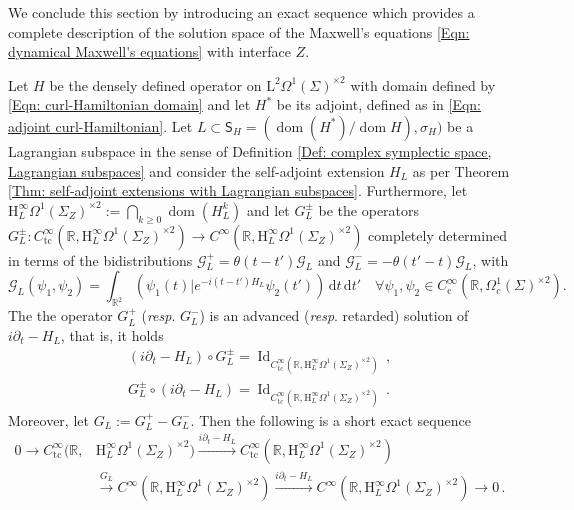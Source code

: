 We conclude this section by introducing an exact sequence which provides a complete description of the solution space of the Maxwell's equations \eqref{Eqn: dynamical Maxwell's equations} with interface $Z$.

\begin{theorem}\label{Thm: exact sequence for Maxwell's equations with interface}
	Let $H$ be the densely defined operator on $\mathrm{L}^2\Omega^1(\Sigma)^{\times2}$ with domain defined by \eqref{Eqn: curl-Hamiltonian domain} and let $H^*$ be its adjoint, defined as in \eqref{Eqn: adjoint curl-Hamiltonian}.
	Let $L\subset \mathsf{S}_H=(\operatorname{dom}(H^*)/\operatorname{dom}H),\sigma_H)$ be a Lagrangian subspace in the sense of Definition \ref{Def: complex symplectic space, Lagrangian subspaces} and consider the self-adjoint extension $H_L$ as per Theorem \ref{Thm: self-adjoint extensions with Lagrangian subspaces}. Furthermore, let $\mathrm{H}^\infty_L\Omega^1(\Sigma_Z)^{\times 2}:=\bigcap_{k\geq 0}\operatorname{dom}(H_L^k)$ and let $G^\pm_L$ be the operators $G^\pm_L\colon C^\infty_{\mathrm{tc}}(\mathbb{R},\mathrm{H}^\infty_L\Omega^1(\Sigma_Z)^{\times 2})\to C^\infty(\mathbb{R},\mathrm{H}^\infty_L\Omega^1(\Sigma_Z)^{\times 2})$ completely determined in terms of the bidistributions $\mathcal{G}_L^+=\theta(t-t')\mathcal{G}_L$ and $\mathcal{G}_L^-=-\theta(t'-t)\mathcal{G}_L$, with
	\begin{equation}\label{Eqn: Fundamental H}
	\mathcal{G}_L(\psi_1,\psi_2)=\int_{\mathbb{R}^2}\left(\psi_1(t)\Big|e^{-i(t-t')H_L}\psi_2(t')\right)\,\mathrm{d} t\,\mathrm{d} t'\quad \forall\psi_1,\psi_2\in C_\mathrm{c}^\infty(\mathbb{R},\Omega_c^1(\Sigma)^{\times 2}).
	\end{equation}
	The the operator $G^+_L$ (\textit{resp}. $G^-_L$) is an advanced (\textit{resp}. retarded) solution of $i\partial_t-H_L$, that is, it holds
	\begin{align}
		(i\partial_t-H_L)\circ G_L^\pm
		=\operatorname{Id}_{C^\infty_{\mathrm{tc}}(\mathbb{R},\mathrm{H}^\infty_L\Omega^1(\Sigma_Z)^{\times 2})}\,,\\
		G_L^\pm\circ(i\partial_t-H_L)%
		=\operatorname{Id}_{C^\infty_{\mathrm{tc}}(\mathbb{R},\mathrm{H}^\infty_L\Omega^1(\Sigma_Z)^{\times 2})}\,.
	\end{align}
	Moreover, let $G_L:=G^+_L-G^-_L$.
	Then the following is a short exact sequence
	\begin{align}
	\nonumber
	0\to
	C^\infty_{\mathrm{tc}}(\mathbb{R},&\mathrm{H}^\infty_L\Omega^1(\Sigma_Z)^{\times 2})
	\stackrel{i\partial_t-H_L}{\longrightarrow}
	C^\infty_{\mathrm{tc}}(\mathbb{R},\mathrm{H}^\infty_L\Omega^1(\Sigma_Z)^{\times 2})\\&
	\label{Eqn: exact sequence}
	\stackrel{G_L}{\longrightarrow}
	C^\infty(\mathbb{R},\mathrm{H}^\infty_L\Omega^1(\Sigma_Z)^{\times 2})
	\stackrel{i\partial_t-H_L}{\longrightarrow}
	C^\infty(\mathbb{R},\mathrm{H}^\infty_L\Omega^1(\Sigma_Z)^{\times 2})
	\to 0\,.
	\end{align}
\end{theorem}

